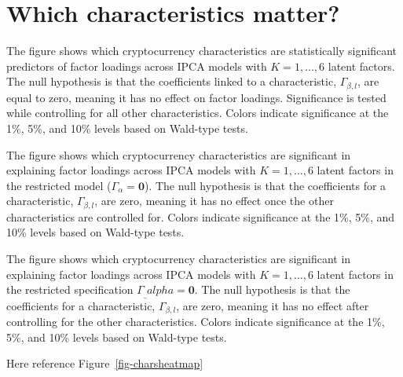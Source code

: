 \documentclass[
  12pt,
  a4paper,
  openany]{scrbook}
\begin{document}
\section{Which characteristics
matter?}\label{which-characteristics-matter}

The figure shows which cryptocurrency characteristics are statistically
significant predictors of factor loadings across IPCA models with
\(K=1,\dots,6\) latent factors. The null hypothesis is that the
coefficients linked to a characteristic, \(\Gamma_{\beta,l}\), are equal
to zero, meaning it has no effect on factor loadings. Significance is
tested while controlling for all other characteristics. Colors indicate
significance at the 1\%, 5\%, and 10\% levels based on Wald-type tests.

The figure shows which cryptocurrency characteristics are significant in
explaining factor loadings across IPCA models with \(K=1,\dots,6\)
latent factors in the restricted model (\(\Gamma_\alpha = \mathbf{0}\)).
The null hypothesis is that the coefficients for a characteristic,
\(\Gamma_{\beta,l}\), are zero, meaning it has no effect once the other
characteristics are controlled for. Colors indicate significance at the
1\%, 5\%, and 10\% levels based on Wald-type tests.

The figure shows which cryptocurrency characteristics are significant in
explaining factor loadings across IPCA models with \(K=1,\dots,6\)
latent factors in the restricted specification
\(\Gamma_\_alpha = \mathbf{0}\). The null hypothesis is that the
coefficients for a characteristic, \(\Gamma_{\beta,l}\), are zero,
meaning it has no effect after controlling for the other
characteristics. Colors indicate significance at the 1\%, 5\%, and 10\%
levels based on Wald-type tests.

Here reference Figure~\ref{fig-charsheatmap}
\end{document}
